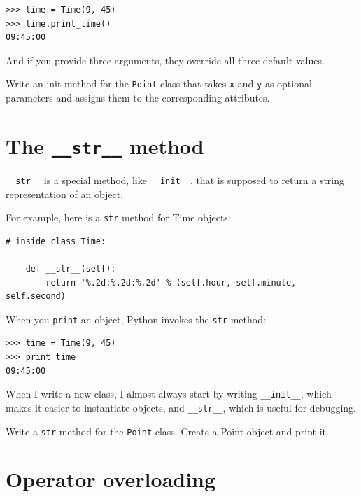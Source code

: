 \documentclass[10pt]{book}
\begin{document}
\begin{CJK}{UTF8}{gbsn}
\begin{verbatim}
>>> time = Time(9, 45)
>>> time.print_time()
09:45:00
\end{verbatim}
%
And if you provide three arguments, they override all three
default values.


\begin{exercise}

Write an init method for the {\tt Point} class that takes
{\tt x} and {\tt y} as optional parameters and assigns
them to the corresponding attributes.
\end{exercise}


\section{The {\tt \_\_str\_\_} method}

\verb"__str__" is a special method, like \verb"__init__",
that is supposed to return a string representation of an object.

For example, here is a {\tt str} method for Time objects:

\begin{verbatim}
# inside class Time:

    def __str__(self):
        return '%.2d:%.2d:%.2d' % (self.hour, self.minute, self.second)
\end{verbatim}
%
When you {\tt print} an object, Python invokes the {\tt str} method:

\begin{verbatim}
>>> time = Time(9, 45)
>>> print time
09:45:00
\end{verbatim}
%
When I write a new class, I almost always start by writing 
\verb"__init__", which makes it easier to instantiate objects, and 
\verb"__str__", which is useful for debugging.


\begin{exercise}

Write a {\tt str} method for the {\tt Point} class.  Create
a Point object and print it.

\end{exercise}


\section{Operator overloading}
\label{operator.overloading}


\end{CJK}
\end{document}
